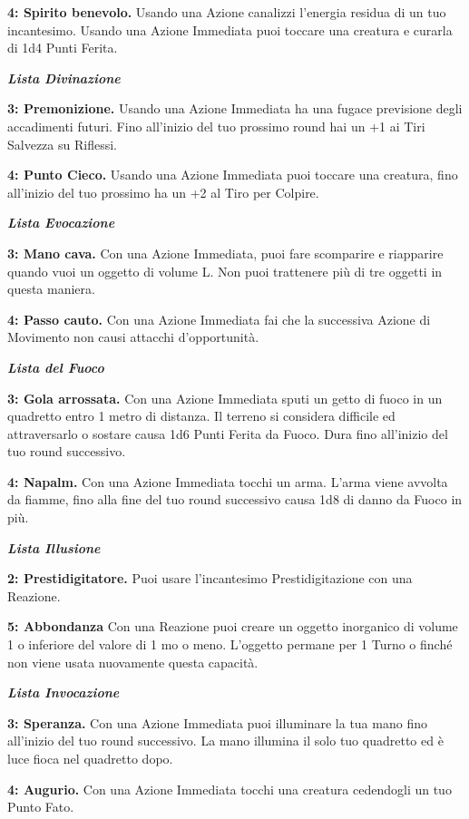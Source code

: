 \begin{multicols}{2}
\textbf{4: Spirito benevolo.} Usando una Azione canalizzi l'energia residua di un tuo incantesimo. Usando una Azione Immediata puoi toccare una creatura e curarla di 1d4 Punti Ferita.

\emph{\textbf{Lista Divinazione}}

\textbf{3: Premonizione.} Usando una Azione Immediata ha una fugace previsione degli accadimenti futuri. Fino all'inizio del tuo prossimo round hai un +1 ai Tiri Salvezza su Riflessi.

\textbf{4: Punto Cieco.} Usando una Azione Immediata puoi toccare una creatura, fino all'inizio del tuo prossimo ha un +2 al Tiro per Colpire.

\emph{\textbf{Lista Evocazione}}

\textbf{3: Mano cava.} Con una Azione Immediata, puoi fare scomparire e riapparire quando vuoi un oggetto di volume L. Non puoi trattenere più di tre oggetti in questa maniera.

\textbf{4: Passo cauto.} Con una Azione Immediata fai che la successiva Azione di Movimento non causi attacchi d'opportunità.

\emph{\textbf{Lista del Fuoco}}

\textbf{3: Gola arrossata.} Con una Azione Immediata sputi un getto di fuoco in un quadretto entro 1 metro di distanza. Il terreno si considera difficile ed attraversarlo o sostare causa 1d6 Punti Ferita da Fuoco. Dura fino all'inizio del tuo round successivo.

\textbf{4: Napalm.} Con una Azione Immediata tocchi un arma. L'arma viene avvolta da fiamme, fino alla fine del tuo round successivo causa 1d8 di danno da Fuoco in più.

\emph{\textbf{Lista Illusione}}

\textbf{2: Prestidigitatore.} Puoi usare l'incantesimo Prestidigitazione con una Reazione.

\textbf{5: Abbondanza} Con una Reazione puoi creare un oggetto inorganico di volume 1 o inferiore del valore di 1 mo o meno. L'oggetto permane per 1 Turno o finché non viene usata nuovamente questa capacità.

\emph{\textbf{Lista Invocazione}}

\textbf{3: Speranza.} Con una Azione Immediata puoi illuminare la tua mano fino all'inizio del tuo round successivo. La mano illumina il solo tuo quadretto ed è luce fioca nel quadretto dopo.

\textbf{4: Augurio.} Con una Azione Immediata tocchi una creatura cedendogli un tuo Punto Fato.


\end{multicols}
